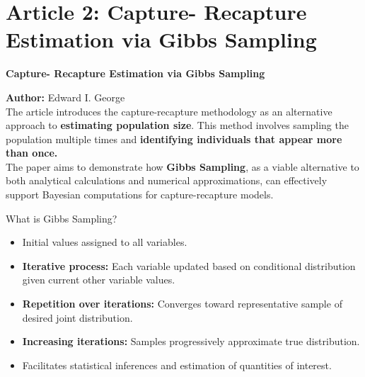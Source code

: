 \documentclass[dvipsnames,mathserif]{beamer}
\begin{document}
{\footnotesize

\section{Article 2: Capture- Recapture Estimation via Gibbs Sampling}
\begin{frame}
    \begin{center}
    \large \textbf{Capture- Recapture Estimation via Gibbs Sampling}\\ 
    \end{center}
    \footnotesize
      \textbf{Author:} Edward I. George\\ \vspace{1.5mm}
      The article introduces the capture-recapture methodology as an alternative approach to \textbf{estimating population size}. This method involves sampling the population multiple times and \textbf{identifying individuals that appear more than once.} \\ \vspace{1mm}
       The paper aims to demonstrate how \textbf{Gibbs Sampling}, as a viable alternative to both analytical calculations and numerical approximations, can effectively support Bayesian computations for capture-recapture models. \\
       \vspace{1mm}
       \begin{block}{What is Gibbs Sampling?}
       \begin{itemize}
           \item Initial values assigned to all variables.
           \item \textbf{Iterative process:} Each variable updated based on conditional distribution given current other variable values.
           \item \textbf{Repetition over iterations:} Converges toward representative sample of desired joint distribution.
           \item \textbf{Increasing iterations:} Samples progressively approximate true distribution.
           \item Facilitates statistical inferences and estimation of quantities of interest.
       \end{itemize}
       \end{block}
    \end{frame} 

}
\end{document}
